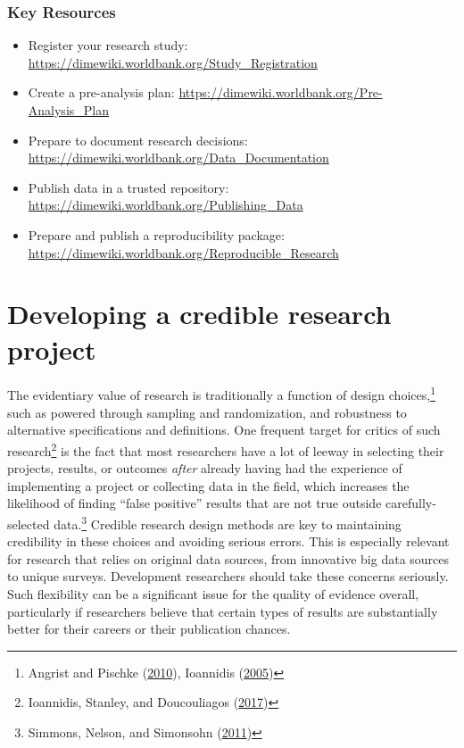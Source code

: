 \documentclass[
]{book}
\providecommand{\tightlist}{%
  \setlength{\itemsep}{0pt}\setlength{\parskip}{0pt}}
\begin{document}
\begin{summary}
\hypertarget{key-resources}{%
\subsubsection*{Key Resources}\label{key-resources}}

\begin{itemize}
\tightlist
\item
  Register your research study: \url{https://dimewiki.worldbank.org/Study_Registration}
\item
  Create a pre-analysis plan: \url{https://dimewiki.worldbank.org/Pre-Analysis_Plan}
\item
  Prepare to document research decisions: \url{https://dimewiki.worldbank.org/Data_Documentation}
\item
  Publish data in a trusted repository: \url{https://dimewiki.worldbank.org/Publishing_Data}
\item
  Prepare and publish a reproducibility package: \url{https://dimewiki.worldbank.org/Reproducible_Research}
\end{itemize}
\end{summary}

\hypertarget{developing-a-credible-research-project}{%
\section*{Developing a credible research project}\label{developing-a-credible-research-project}}

The evidentiary value of research is traditionally a function of design choices,\footnote{Angrist and Pischke (\protect\hyperlink{ref-angrist2010credibility}{2010}), Ioannidis (\protect\hyperlink{ref-ioannidis2005most}{2005})}
such as powered through sampling and randomization,
and robustness to alternative specifications and definitions.
One frequent target for critics of such research\footnote{Ioannidis, Stanley, and Doucouliagos (\protect\hyperlink{ref-ioannidis2017power}{2017})}
is the fact that most researchers have a lot of leeway
in selecting their projects, results, or outcomes
\emph{after} already having had the experience of implementing a project
or collecting data in the field,
which increases the likelihood of finding ``false positive''
results that are not true outside carefully-selected data.\footnote{Simmons, Nelson, and Simonsohn (\protect\hyperlink{ref-simmons2011false}{2011})}
Credible research design methods are key to maintaining credibility
in these choices and avoiding serious errors.
This is especially relevant for research that relies on original data sources,
from innovative big data sources to unique surveys.
Development researchers should take these concerns seriously.
Such flexibility can be a significant issue for the quality of evidence overall,
particularly if researchers believe that certain types of results
are substantially better for their careers or their publication chances.
\end{document}
